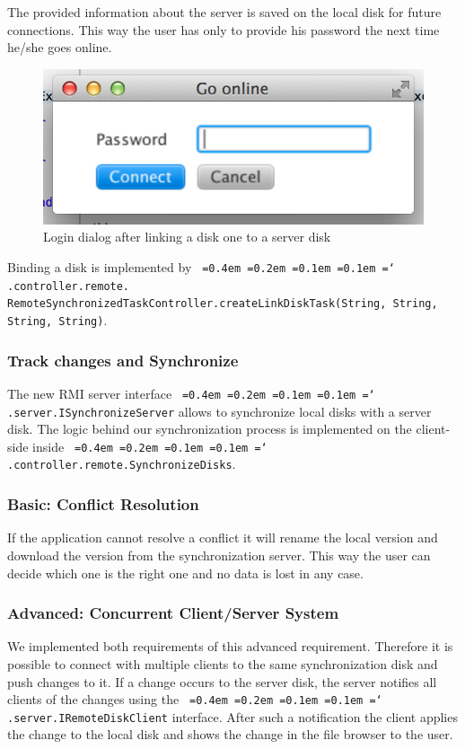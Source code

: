 \documentclass[a4paper,12pt]{article}
\newcommand*\justify{%
  \fontdimen2\font=0.4em%
  \fontdimen3\font=0.2em%
  \fontdimen4\font=0.1em%
  \fontdimen7\font=0.1em%
  \hyphenchar\font=`\-%
}
\newcommand{\mono}[1]{\texttt{\justify #1}}
\begin{document}
The provided information about the server is saved on the local disk for future connections. This way the user has only to provide his password the next time he/she goes online.

\begin{figure}[H]\centering
    \includegraphics[scale=0.7]{login.png}
    \caption{Login dialog after linking a disk one to a server disk}
\end{figure}

Binding a disk is implemented by \mono{.controller.remote.\\ RemoteSynchronizedTaskController.createLinkDiskTask(String, String, String, String)}.

\subsubsection{Track changes and Synchronize}
The new RMI server interface \mono{.server.ISynchronizeServer} allows to synchronize local disks with a server disk. The logic behind our synchronization process is implemented on the client-side inside \mono{.controller.remote.SynchronizeDisks}.

\subsubsection{Basic: Conflict Resolution}
If the application cannot resolve a conflict it will rename the local version and download the version from the synchronization server. This way the user can decide which one is the right one and no data is lost in any case.

\subsubsection{Advanced: Concurrent Client/Server System}
We implemented both requirements of this advanced requirement. Therefore it is possible to connect with multiple clients to the same synchronization disk and push changes to it. If a change occurs to the server disk, the server notifies all clients of the changes using the \mono{.server.IRemoteDiskClient} interface. After such a notification the client applies the change to the local disk and shows the change in the file browser to the user.
\end{document}

